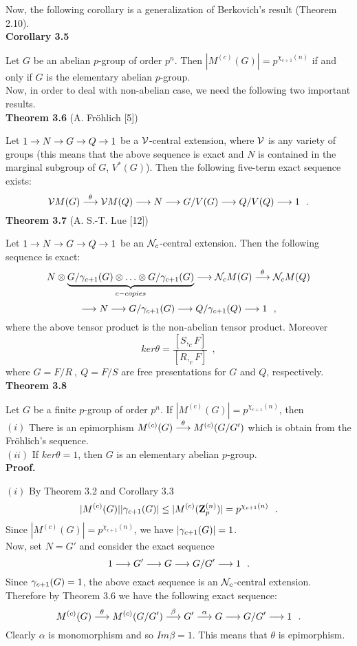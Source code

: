 Now, the following corollary is a generalization of Berkovich's result (Theorem 2.10).\\
{\bf Corollary 3.5}

 Let $G$ be an abelian $p$-group of order $p^n$. Then
$|M^{(c)}(G)|=p^{\chi_{c+1}(n)}$ if and only if $G$ is the elementary abelian
$p$-group.\\

Now, in order to deal with non-abelian case, we need the following two
important results.\\
{\bf Theorem 3.6} (A. Fr\"{o}hlich [5])

 Let $1\rightarrow N\rightarrow G\rightarrow Q\rightarrow 1$ be a $\cal V$-central extension, where $\cal V$ is
any variety of groups (this means that the above sequence is exact and $N$ is
contained in the marginal subgroup of $G$, $V^*(G)$). Then the following
five-term exact sequence exists:
$$ {\cal V}M(G)\stackrel {\theta}{\longrightarrow} {\cal V}M(Q)\longrightarrow N\longrightarrow G/V(G)\longrightarrow Q/V(Q)\longrightarrow
1\ \ .$$
{\bf Theorem 3.7} (A. S.-T. Lue [12])

 Let $1\rightarrow N\rightarrow G\rightarrow Q\rightarrow 1$ be an ${\cal N}_c$-central extension. Then the
following sequence is exact:
$$N\otimes \underbrace{G/\gamma_{c+1}(G)\otimes \ldots \otimes
G/\gamma_{c+1}(G)}_{c-copies}\longrightarrow {\cal
N}_cM(G)\stackrel {\theta}{\longrightarrow }{\cal N}_cM(Q)$$ $$\longrightarrow N\longrightarrow G/\gamma_{c+1}(G)\longrightarrow
Q/\gamma_{c+1}(Q)\longrightarrow 1\ \ ,$$
where the above tensor product is the non-abelian tensor product. Moreover
 $$ ker\theta =\frac {[S, _cF]}{[R, _cF]}\ \ ,$$
where $G=F/R\ ,\ Q=F/S$ are free presentations for $G$ and $Q$, respectively.\\
{\bf Theorem 3.8}

 Let $G$ be a finite $p$-group of order $p^n$. If
$|M^{(c)}(G)|=p^{\chi_{c+1}(n)}$, then\\
$(i)$ There is an epimorphism $M^{(c)}(G)\stackrel {\theta}{\longrightarrow }M^{(c)}(G/G')$ which
is obtain from the Fr\"{o}hlich's sequence.\\
$(ii)$ If $ker\theta =1$, then $G$ is an elementary abelian $p$-group.\\
{\bf Proof.}

 $(i)$ By Theorem 3.2 and Corollary 3.3
$$ |M^{(c)}(G)||\gamma_{c+1}(G)|\leq |M^{(c)}({\bf Z}_p^{(n)})|=p^{\chi_{c+1}(n)}\
\ .$$
Since $|M^{(c)}(G)|=p^{\chi_{c+1}(n)}$, we have $|\gamma_{c+1}(G)|=1$.\\
Now, set $N=G'$ and consider the exact sequence
$$ 1\longrightarrow G'\longrightarrow G\longrightarrow G/G'\longrightarrow 1 \ \ .$$
Since $\gamma_{c+1}(G)=1$, the above exact sequence is an ${\cal N}_c$-central
extension. Therefore by Theorem 3.6 we have the following exact sequence:
$$M^{(c)}(G)\stackrel {\theta}{\longrightarrow }M^{(c)}(G/G')\stackrel {\beta}{\longrightarrow}
G'\stackrel{\alpha}{\longrightarrow} G\longrightarrow G/G'\longrightarrow 1\ \ .$$
Clearly $\alpha$ is monomorphism and so $Im\beta =1$. This means that $\theta$
is epimorphism.

